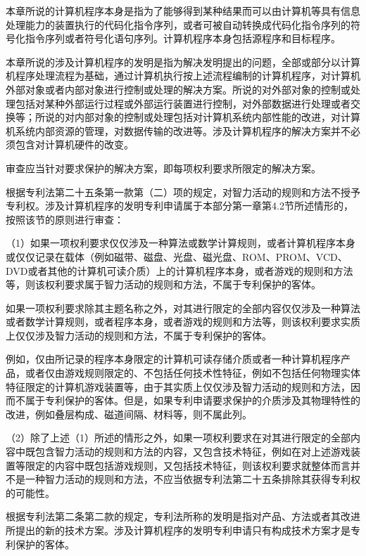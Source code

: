 本章所说的计算机程序本身是指为了能够得到某种结果而可以由计算机等具有信息处理能力的装置执行的代码化指令序列，或者可被自动转换成代码化指令序列的符号化指令序列或者符号化语句序列。计算机程序本身包括源程序和目标程序。

本章所说的涉及计算机程序的发明是指为解决发明提出的问题，全部或部分以计算机程序处理流程为基础，通过计算机执行按上述流程编制的计算机程序，对计算机外部对象或者内部对象进行控制或处理的解决方案。所说的对外部对象的控制或处理包括对某种外部运行过程或外部运行装置进行控制，对外部数据进行处理或者交换等；所说的对内部对象的控制或处理包括对计算机系统内部性能的改进，对计算机系统内部资源的管理，对数据传输的改进等。涉及计算机程序的解决方案并不必须包含对计算机硬件的改变。

审查应当针对要求保护的解决方案，即每项权利要求所限定的解决方案。

根据专利法第二十五条第一款第（二）项的规定，对智力活动的规则和方法不授予专利权。涉及计算机程序的发明专利申请属于本部分第一章第4.2节所述情形的，按照该节的原则进行审查：

{\setlength{\parindent}{17.1bp}（1）如果一项权利要求仅仅涉及一种算法或数学计算规则，或者计算机程序本身或仅仅记录在载体（例如磁带、磁盘、光盘、磁光盘、ROM、PROM、VCD、DVD或者其他的计算机可读介质）上的计算机程序本身，或者游戏的规则和方法等，则该权利要求属于智力活动的规则和方法，不属于专利保护的客体。\par}

如果一项权利要求除其主题名称之外，对其进行限定的全部内容仅仅涉及一种算法或者数学计算规则，或者程序本身，或者游戏的规则和方法等，则该权利要求实质上仅仅涉及智力活动的规则和方法，不属于专利保护的客体。

例如，仅由所记录的程序本身限定的计算机可读存储介质或者一种计算机程序产品，或者仅由游戏规则限定的、不包括任何技术性特征，例如不包括任何物理实体特征限定的计算机游戏装置等，由于其实质上仅仅涉及智力活动的规则和方法，因而不属于专利保护的客体。但是，如果专利申请要求保护的介质涉及其物理特性的改进，例如叠层构成、磁道间隔、材料等，则不属此列。

{\setlength{\parindent}{17.1bp}（2）除了上述（1）所述的情形之外，如果一项权利要求在对其进行限定的全部内容中既包含智力活动的规则和方法的内容，又包含技术特征，例如在对上述游戏装置等限定的内容中既包括游戏规则，又包括技术特征，则该权利要求就整体而言并不是一种智力活动的规则和方法，不应当依据专利法第二十五条排除其获得专利权的可能性。\par}

根据专利法第二条第二款的规定，专利法所称的发明是指对产品、方法或者其改进所提出的新的技术方案。涉及计算机程序的发明专利申请只有构成技术方案才是专利保护的客体。

